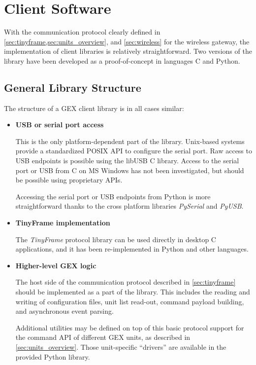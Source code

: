 \chapter{Client Software} \label{sec:clientsw}

With the communication protocol clearly defined in \cref{sec:tinyframe,sec:units_overview}, and \cref{sec:wireless} for the wireless gateway, the implementation of client libraries is relatively straightforward. Two versions of the library have been developed as a proof-of-concept in languages C and Python.

\section{General Library Structure}

The structure of a GEX client library is in all cases similar:

\begin{itemize}
    \item \textbf{USB or serial port access}

        This is the only platform-dependent part of the library. Unix-based systems provide a standardized POSIX API to configure the serial port. Raw access to \gls{USB} endpoints is possible using the libUSB C library. Access to the serial port or \gls{USB} from C on MS Windows has not been investigated, but should be possible using proprietary APIs.

        Accessing the serial port or \gls{USB} endpoints from Python is more straightforward thanks to the cross platform libraries \textit{PySerial} and \textit{PyUSB}.

    \item \textbf{TinyFrame implementation}

        The \textit{TinyFrame} protocol library can be used directly in desktop C applications, and it has been re-implemented in Python and other languages.

    \item \textbf{Higher-level GEX logic}

        The host side of the communication protocol described in \cref{sec:tinyframe} should be implemented as a part of the library. This includes the reading and writing of configuration files, unit list read-out, command payload building, and asynchronous event parsing.

        Additional utilities may be defined on top of this basic protocol support for the command API of different GEX units, as described in \cref{sec:units_overview}. Those unit-specific ``drivers'' are available in the provided Python library.
\end{itemize}

